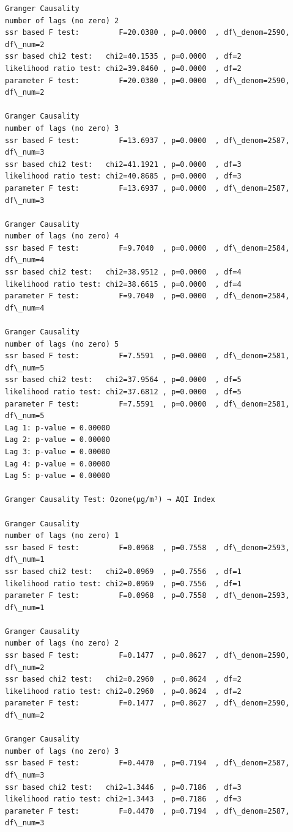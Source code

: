 \documentclass[11pt]{article}
\begin{document}
\begin{Verbatim}[commandchars=\\\{\}]
Granger Causality
number of lags (no zero) 2
ssr based F test:         F=20.0380 , p=0.0000  , df\_denom=2590, df\_num=2
ssr based chi2 test:   chi2=40.1535 , p=0.0000  , df=2
likelihood ratio test: chi2=39.8460 , p=0.0000  , df=2
parameter F test:         F=20.0380 , p=0.0000  , df\_denom=2590, df\_num=2

Granger Causality
number of lags (no zero) 3
ssr based F test:         F=13.6937 , p=0.0000  , df\_denom=2587, df\_num=3
ssr based chi2 test:   chi2=41.1921 , p=0.0000  , df=3
likelihood ratio test: chi2=40.8685 , p=0.0000  , df=3
parameter F test:         F=13.6937 , p=0.0000  , df\_denom=2587, df\_num=3

Granger Causality
number of lags (no zero) 4
ssr based F test:         F=9.7040  , p=0.0000  , df\_denom=2584, df\_num=4
ssr based chi2 test:   chi2=38.9512 , p=0.0000  , df=4
likelihood ratio test: chi2=38.6615 , p=0.0000  , df=4
parameter F test:         F=9.7040  , p=0.0000  , df\_denom=2584, df\_num=4

Granger Causality
number of lags (no zero) 5
ssr based F test:         F=7.5591  , p=0.0000  , df\_denom=2581, df\_num=5
ssr based chi2 test:   chi2=37.9564 , p=0.0000  , df=5
likelihood ratio test: chi2=37.6812 , p=0.0000  , df=5
parameter F test:         F=7.5591  , p=0.0000  , df\_denom=2581, df\_num=5
Lag 1: p-value = 0.00000
Lag 2: p-value = 0.00000
Lag 3: p-value = 0.00000
Lag 4: p-value = 0.00000
Lag 5: p-value = 0.00000

Granger Causality Test: Ozone(µg/m³) → AQI Index

Granger Causality
number of lags (no zero) 1
ssr based F test:         F=0.0968  , p=0.7558  , df\_denom=2593, df\_num=1
ssr based chi2 test:   chi2=0.0969  , p=0.7556  , df=1
likelihood ratio test: chi2=0.0969  , p=0.7556  , df=1
parameter F test:         F=0.0968  , p=0.7558  , df\_denom=2593, df\_num=1

Granger Causality
number of lags (no zero) 2
ssr based F test:         F=0.1477  , p=0.8627  , df\_denom=2590, df\_num=2
ssr based chi2 test:   chi2=0.2960  , p=0.8624  , df=2
likelihood ratio test: chi2=0.2960  , p=0.8624  , df=2
parameter F test:         F=0.1477  , p=0.8627  , df\_denom=2590, df\_num=2

Granger Causality
number of lags (no zero) 3
ssr based F test:         F=0.4470  , p=0.7194  , df\_denom=2587, df\_num=3
ssr based chi2 test:   chi2=1.3446  , p=0.7186  , df=3
likelihood ratio test: chi2=1.3443  , p=0.7186  , df=3
parameter F test:         F=0.4470  , p=0.7194  , df\_denom=2587, df\_num=3


\end{Verbatim}
\end{document}
